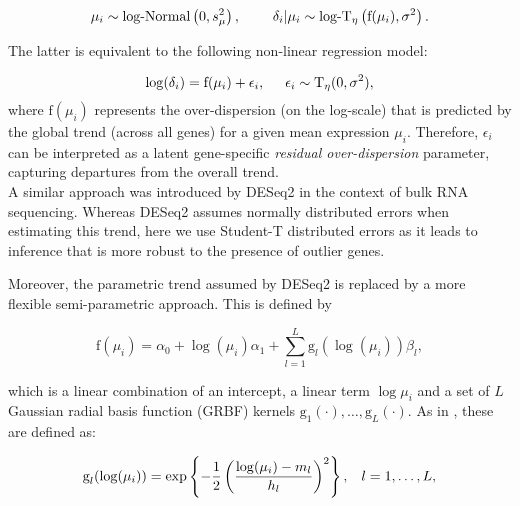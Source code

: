 \begin{equation} \label{eq::jointprior} \mu_i \sim \text{log-Normal}\left(0, s^2_{\mu}\right), \hspace{0.8cm}
\delta_i | \mu_i \sim \text{log-}\text{T}_{\eta}\left( \text{f}(\mu_i), \sigma^2 \right).
\end{equation} 

The latter is equivalent to the following non-linear regression model:

\begin{equation} \label{eq::regression}
\log(\delta_i) =\text{f}(\mu_i)+\epsilon_i, \hspace{0.5cm} \epsilon_i \sim{}\text{T}_{\eta}(0,\sigma^2), 
\end{equation} where $\text{f}(\mu_i)$ represents the over-dispersion (on the log-scale) that is predicted by the global trend (across all genes) for a given mean expression $\mu_i$. Therefore, $\epsilon_i$ can be interpreted as a latent gene-specific \textit{residual over-dispersion} parameter, capturing departures from the overall trend. \\

A similar approach was introduced by DESeq2 \citep{Love2014} in the context of bulk RNA sequencing. Whereas DESeq2 assumes normally distributed errors when estimating this trend, here we use Student-T distributed errors as it leads to inference that is more robust to the presence of outlier genes. 

\newpage

Moreover, the parametric trend assumed by DESeq2 is replaced by a more flexible semi-parametric approach. This is defined by

\begin{equation} \label{eq::trend}
\text{f}(\mu_i) = \alpha_0 + \log(\mu_i)\alpha_1 + \sum_{l=1}^L \text{g}_l(\log(\mu_i))\beta_l,
\end{equation} 

which is a linear combination of an intercept, a linear term $\log{\mu_i}$ and a set of $L$ Gaussian radial basis function (GRBF) kernels $\text{g}_1(\cdot), \ldots, \text{g}_L(\cdot)$. As in \cite{Kapourani2016}, these are defined as: 

\begin{equation} \label{eq::GRBF}
\text{g}_l(\log(\mu_i)) = \exp\left\lbrace-\frac{1}{2}\left(\dfrac{\log(\mu_i)-m_l}{h_l}\right)^2\right\rbrace, \hspace{0.3cm} l = 1, \ldots, L,
\end{equation} 

